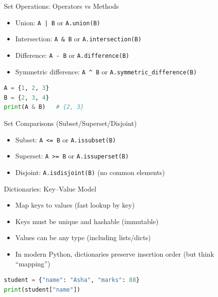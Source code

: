\documentclass{beamer}
\begin{document}
\begin{frame}[fragile]{Set Operations: Operators vs Methods}
  \begin{itemize}[<+->]
    \item Union: \texttt{A | B} \hspace{1em} or \hspace{1em} \texttt{A.union(B)}
    \item Intersection: \texttt{A \& B} \hspace{0.75em} or \hspace{0.75em} \texttt{A.intersection(B)}
    \item Difference: \texttt{A - B} \hspace{1em} or \hspace{1em} \texttt{A.difference(B)}
    \item Symmetric difference: \texttt{A \string^ B} \hspace{0.35em} or \hspace{0.35em} \texttt{A.symmetric\_difference(B)}
  \end{itemize}
  \vspace{0.3em}
  \begin{lstlisting}[language=Python]
A = {1, 2, 3}
B = {2, 3, 4}
print(A & B)   # {2, 3}
  \end{lstlisting}
\end{frame}

\begin{frame}[fragile]{Set Comparisons (Subset/Superset/Disjoint)}
  \begin{itemize}[<+->]
    \item Subset: \texttt{A <= B} or \texttt{A.issubset(B)}
    \item Superset: \texttt{A >= B} or \texttt{A.issuperset(B)}
    \item Disjoint: \texttt{A.isdisjoint(B)} (no common elements)
  \end{itemize}
\end{frame}


\begin{frame}[fragile]{Dictionaries: Key--Value Model}
  \begin{itemize}[<+->]
    \item Map keys to values (fast lookup by key)
    \item Keys must be unique and hashable (immutable)
    \item Values can be any type (including lists/dicts)
    \item In modern Python, dictionaries preserve insertion order (but think ``mapping'')
  \end{itemize}
  \vspace{0.3em}
  \begin{lstlisting}[language=Python]
student = {"name": "Asha", "marks": 88}
print(student["name"])
  \end{lstlisting}
\end{frame}
\end{document}
